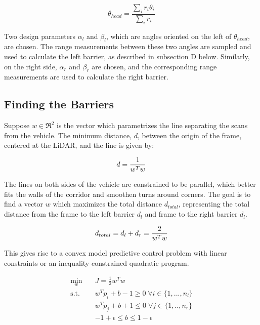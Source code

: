 \documentclass[conference]{IEEEtran}
\begin{document}
\[\theta_{head} = \frac{\sum_{i} r_i \theta_i}{\sum_{i} r_i} \]

Two design parameters $\alpha_l$ and $\beta_l$, which are angles oriented on the left of $\theta_{head}$, are chosen.  The range measurements between these two angles are sampled and used to calculate the left barrier, as described in subsection D below. Similarly, on the right side, $\alpha_r$ and $\beta_r$ are chosen, and the corresponding range measurements are used to calculate the right barrier. 


\subsection{Finding the Barriers}
Suppose $w \in \Re^2$  is the vector which parametrizes the line separating the scans from the vehicle. The minimum distance, $d$, between the origin of the frame, centered at the LiDAR, and the line is given by:

\begin{align}
    d = \frac{1}{w^T w} \notag
\end{align}

The lines on both sides of the vehicle are constrained to be parallel, which better fits the walls of the corridor and smoothen turns around corners. The goal is to find a vector $w$ which maximizes the total distance $d_{total}$, representing the total distance from the frame to the left barrier $d_l$ and frame to the right barrier $d_l$. 

\begin{align}
    d_{total} = d_l + d_r = \frac{2}{w^T w} \notag
\end{align}


This gives rise to a convex model predictive control problem with linear constraints or an inequality-constrained quadratic program.  

\begin{equation}
\begin{aligned}
        \min_{w}  \quad & J = \frac{1}{2}w^T w \\
        \text{s.t.} \quad & w^Tp_i + b - 1 \geq 0  \; \forall i \in \{1,...,n_l\} \\
        & w^Tp_j + b + 1 \leq 0 \; \forall j \in \{1,..,n_r\}\\ 
        & -1+\epsilon \leq b \leq 1 - \epsilon
\end{aligned}
\end{equation}
\end{document}
